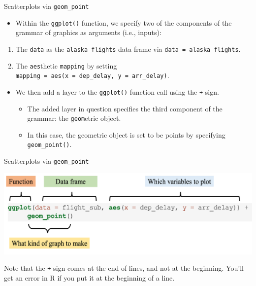 \documentclass[
  ignorenonframetext,
]{beamer}
\providecommand{\tightlist}{%
  \setlength{\itemsep}{0pt}\setlength{\parskip}{0pt}}
\begin{document}
\begin{frame}[fragile]{Scatterplots via \texttt{geom\_point}}
\protect\hypertarget{scatterplots-via-geom_point-1}{}
\begin{itemize}
\tightlist
\item
  Within the \texttt{ggplot()} function, we specify two of the
  components of the grammar of graphics as arguments (i.e., inputs):
\end{itemize}

\begin{enumerate}
\item
  The \texttt{data} as the \texttt{alaska\_flights} data frame via
  \texttt{data\ =\ alaska\_flights}.
\item
  The \texttt{aes}thetic \texttt{mapping} by setting
  \texttt{mapping\ =\ aes(x\ =\ dep\_delay,\ y\ =\ arr\_delay)}.
\end{enumerate}

\begin{itemize}
\item
  We then add a layer to the \texttt{ggplot()} function call using the
  \texttt{+} sign.

  \begin{itemize}
  \tightlist
  \item
    The added layer in question specifies the third component of the
    grammar: the \texttt{geom}etric object.
  \item
    In this case, the geometric object is set to be points by specifying
    \texttt{geom\_point()}.
  \end{itemize}
\end{itemize}
\end{frame}

\begin{frame}[fragile]{Scatterplots via \texttt{geom\_point}}
\protect\hypertarget{scatterplots-via-geom_point-2}{}
\tiny

\begin{center}\includegraphics[width=0.8\linewidth,height=0.4\textheight]{Week2_1} \end{center}
\normalsize

Note that the \texttt{+} sign comes at the end of lines, and not at the
beginning. You'll get an error in R if you put it at the beginning of a
line.
\end{frame}
\end{document}
